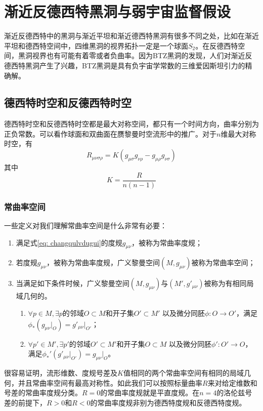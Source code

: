 \chapter{渐近反德西特黑洞与弱宇宙监督假设}
渐近反德西特中的黑洞与渐近平坦和渐近德西特黑洞有很多不同之处，比如在渐近平坦和德西特空间中，四维黑洞的视界拓扑一定是一个球面$S_2$\citep{friedman1993topological}。在反德西特空间，黑洞视界也有可能有着零或者负曲率\citep{cai2004thermodynamics}。因为BTZ黑洞\citep{banados1992black}的发现，人们对渐近反德西特黑洞产生了兴趣，BTZ黑洞是具有负宇宙学常数的三维爱因斯坦引力的精确解\citep{cai1999topological}。

\section{德西特时空和反德西特时空}
德西特时空和反德西特时空都是最大对称空间，都只有一个时间方向，曲率分别为正负常数。可以看作球面和双曲面在赝黎曼时空流形中的推广\citep{陈斌2018广义相对论}。对于$n$维最大对称时空，有
\begin{equation}\label{eq: changqulvdugui}
    R_{\mu \nu \sigma \rho}=K\left(g_{\mu \sigma}g_{\nu \rho}-g_{\mu \rho}g_{\nu \sigma}\right)
\end{equation}
其中
\begin{equation}
    K=\frac{R}{n \left(n-1\right)}
\end{equation}
\subsection{常曲率空间}
一些定义对我们理解常曲率空间是什么非常有必要\citep{梁灿彬2006微分几何入门与广义相对论}：
\begin{enumerate}
    \item 满足式\eqref{eq: changqulvdugui}的度规$g_{\mu \nu}$，被称为常曲率度规；
    \item 若度规$g_{\mu \nu}$，被称为常曲率度规，广义黎曼空间$\left(M,g_{\mu \nu}\right)$被称为常曲率空间；
    \item 当满足如下条件时候，广义黎曼空间$\left(M,g_{\mu \nu}\right)$与$\left(M',g'_{\mu \nu}\right)$被称为有相同局域几何的。
    \begin{enumerate}
        \item $\forall p \in M, \exists p$的邻域$O\subset M$和开子集$O'\subset M'$ 以及微分同胚$\phi: O\rightarrow O'$，满足$\phi_* \left(g_{\mu \nu} |  _O\right)=g'_{\mu \nu}| _{O'}$；
        \item $\forall p' \in M', \exists p'$的邻域$O'\subset M'$和开子集$O\subset M$ 以及微分同胚$\phi': O'\rightarrow O$，满足$\phi_*' \left(g'_{\mu \nu} |_{O'}\right)=g_{\mu \nu}| _O$。
    \end{enumerate}
\end{enumerate}
很容易证明，流形维数、度规号差及$K$值相同的两个常曲率空间有相同的局域几何，并且常曲率空间有最高对称性\citep{梁灿彬2006微分几何入门与广义相对论}。如此我们可以按照标量曲率$R$来对给定维数和号差的常曲率度规分类。$R=0$的常曲率度规就是平直度规。在$n=4$的洛伦兹号差的前提下，$R>0$和$R<0$的常曲率度规非别为德西特度规和反德西特度规。
